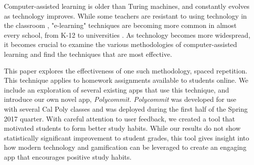 \par Computer-assisted learning is older than Turing machines, and constantly evolves as technology improves. While some teachers are resistant to using technology in the classroom \cite{BJET:BJET12051}, "e-learning" techniques are becoming more common in almost every school, from K-12 to universities \cite{EJED:EJED12020}. As technology becomes more widespread, it becomes crucial to examine the various methodologies of computer-assisted learning and find the techniques that are most effective.

\par This paper explores the effectiveness of one such methodology, spaced repetition. This technique applies to homework assignments available to students online. We include an exploration of several existing apps that use this technique, and introduce our own novel app, \textit{Polycommit.} \textit{Polycommit} was developed for use with several Cal Poly classes and was deployed during the first half of the Spring 2017 quarter. With careful attention to user feedback, we created a tool that motivated students to form better study habits. While our results do not show statistically significant improvement to student grades, this tool gives insight into how modern technology and gamification can be leveraged to create an engaging app that encourages positive study habits.